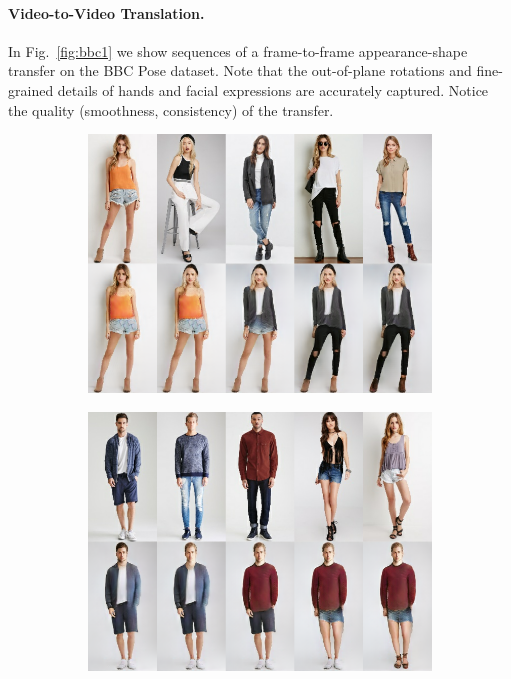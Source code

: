 \paragraph{Video-to-Video Translation.}
In Fig.~\ref{fig:bbc1} we show sequences of a frame-to-frame appearance-shape transfer on the BBC Pose dataset. Note that the out-of-plane rotations and fine-grained details of hands and facial expressions are accurately captured. Notice the quality (smoothness, consistency) of the transfer.
%
\begin{figure}[b!]
    \vspace*{-1.em}
	\centering
	\begin{subfigure}{.43\linewidth}
	\includegraphics[trim={0cm 0cm 0cm 0cm},clip, width=1.\linewidth]{fig/supp/DeepF/1}
	\label{fig:part3_21}
	\end{subfigure}\hspace{0.03\textwidth}
	\vspace*{-1.em}
	\centering
	\begin{subfigure}{.43\linewidth}
	\includegraphics[trim={0cm 0cm 0cm 0cm},clip, width=1.\linewidth]{fig/supp/DeepF/6}

\end{subfigure}
\end{figure}
